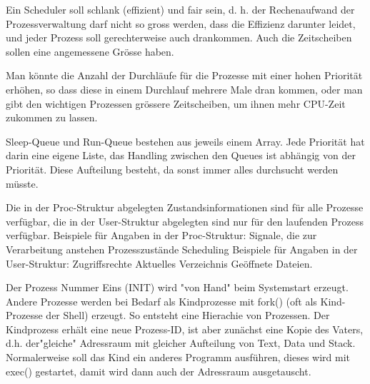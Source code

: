 \begin{answer}
Ein Scheduler soll schlank (effizient) und fair sein, d. h. der Rechenaufwand der Prozessverwaltung
darf nicht so gross werden, dass die Effizienz darunter leidet, und jeder Prozess soll
gerechterweise auch drankommen. Auch die Zeitscheiben sollen eine angemessene Grösse
haben.
\end{answer}

\begin{answer}
Man könnte die Anzahl der Durchläufe für die Prozesse mit einer hohen Priorität erhöhen,
so dass diese in einem Durchlauf mehrere Male dran kommen, oder man gibt den wichtigen
Prozessen grössere Zeitscheiben, um ihnen mehr CPU-Zeit zukommen zu lassen.
\end{answer}

\begin{answer}
Sleep-Queue und Run-Queue bestehen aus jeweils einem Array. Jede Priorität hat darin
eine eigene Liste, das Handling zwischen den Queues ist abhängig von der Priorität. Diese
Aufteilung besteht, da sonst immer alles durchsucht werden müsste.
\end{answer}

\begin{answer}
Die in der Proc-Struktur abgelegten Zustandsinformationen sind für alle Prozesse verfügbar,
die in der User-Struktur abgelegten sind nur für den laufenden Prozess verfügbar.
Beispiele für Angaben in der Proc-Struktur:
Signale, die zur Verarbeitung anstehen
Prozesszustände
Scheduling
Beispiele für Angaben in der User-Struktur:
Zugriffsrechte
Aktuelles Verzeichnis
Geöffnete Dateien.
\end{answer}

\begin{answer}
Der Prozess Nummer Eins (INIT) wird "von Hand" beim Systemstart erzeugt.
Andere Prozesse werden bei Bedarf als Kindprozesse mit fork() (oft als Kind-Prozesse
der Shell) erzeugt. So entsteht eine Hierachie von Prozessen. Der Kindprozess erhält eine
neue Prozess-ID, ist aber zunächst eine Kopie des Vaters, d.h. der"gleiche" Adressraum
mit gleicher Aufteilung von Text, Data und Stack. Normalerweise soll das Kind ein anderes
Programm ausführen, dieses wird mit exec() gestartet, damit wird dann auch der
Adressraum ausgetauscht.
\end{answer}

